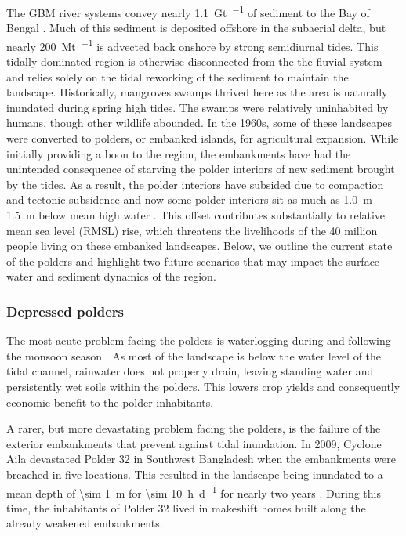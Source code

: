 \documentclass{wscpaperproc}
\theoremstyle{wsc}
\begin{document}
The GBM river systems convey nearly \SI{1.1}{\giga\tonne\per\year} of sediment to the Bay of Bengal \cite{millimanGeomorphicTectonicControl1992}. Much of this sediment is deposited offshore in the subaerial delta, but nearly \SI{200}{\mega\tonne\per\year} is advected back onshore by strong semidiurnal tides. This tidally-dominated region is otherwise disconnected from the the fluvial system and relies solely on the tidal reworking of the sediment to maintain the landscape. Historically, mangroves swamps thrived here as the area is naturally inundated during spring high tides. The swamps were relatively uninhabited by humans, though other wildlife abounded. In the 1960s, some of these landscapes were converted to polders, or embanked islands, for agricultural expansion. While initially providing a boon to the region, the embankments have had the unintended consequence of starving the polder interiors of new sediment brought by the tides. As a result, the polder interiors have subsided due to compaction and tectonic subsidence and now some polder interiors sit as much as \SIrange{1.0}{1.5}{\meter} below mean high water \cite{auerbachFloodRiskNatural2015}. This offset contributes substantially to relative mean sea level (RMSL) rise, which threatens the livelihoods of the 40 million people living on these embanked landscapes. Below, we outline the current state of the polders and highlight two future scenarios that may impact the surface water and sediment dynamics of the region.

\subsubsection{Depressed polders}

The most acute problem facing the polders is waterlogging during and following the monsoon season \cite{khadimIntegratedWaterResources2013a}. As most of the landscape is below the water level of the tidal channel, rainwater does not properly drain, leaving standing water and persistently wet soils within the polders. This lowers crop yields and consequently economic benefit to the polder inhabitants.

A rarer, but more devastating problem facing the polders, is the failure of the exterior embankments that prevent against tidal inundation. In 2009, Cyclone Aila devastated Polder 32 in Southwest Bangladesh when the embankments were breached in five locations. This resulted in the landscape being inundated to a mean depth of \SI{\sim 1}{\meter} for \SI{\sim 10}{\hour\per\day} for nearly two years \cite{auerbachFloodRiskNatural2015}. During this time, the inhabitants of Polder 32 lived in makeshift homes built along the already weakened embankments.
\end{document}
